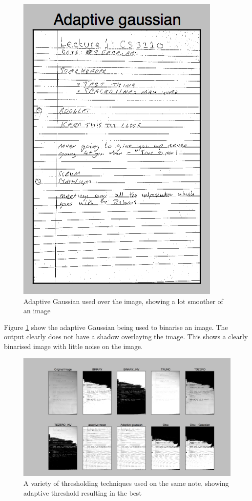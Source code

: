 \begin{figure}[H]
  \centering
  \includegraphics{images/adaptive_gaussian}
  \caption{Adaptive Gaussian used over the image, showing a lot smoother of an image}
  \label{fig:adaptive_gaussian}
\end{figure}

Figure \ref{fig:adaptive_gaussian} show the adaptive Gaussian being used to binarise an image. The output clearly does not have a shadow overlaying the image. This shows a clearly binarised image with little noise on the image.

\begin{figure}[H]
  \centering
  \includegraphics[scale=0.3]{images/thresholding_options}
  \caption{A variety of thresholding techniques used on the same note, showing adaptive threshold resulting in the best}
  \label{fig:thresholding_options}
\end{figure}


